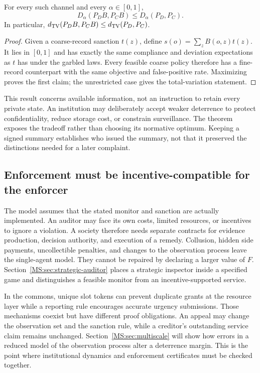 \begin{MSproposition}\label{MS:prop:enforcement-garbling}
For every such channel and every $\alpha\in[0,1]$,
\[
D_\alpha(P_D B,P_C B)\leq D_\alpha(P_D,P_C).
\]
In particular, $d_{\mathrm{TV}}(P_D B,P_C B)\leq d_{\mathrm{TV}}(P_D,P_C)$.
\end{MSproposition}
\begin{proof}
Given a coarse-record sanction $t(z)$, define $s(o)=\sum_z B(o,z)t(z)$. It lies in $[0,1]$ and has exactly the same compliance and deviation expectations as $t$ has under the garbled laws. Every feasible coarse policy therefore has a fine-record counterpart with the same objective and false-positive rate. Maximizing proves the first claim; the unrestricted case gives the total-variation statement.
\end{proof}

This result concerns available information, not an instruction to retain every private state. An institution may deliberately accept weaker deterrence to protect confidentiality, reduce storage cost, or constrain surveillance. The theorem exposes the tradeoff rather than choosing its normative optimum. Keeping a signed summary establishes who issued the summary, not that it preserved the distinctions needed for a later complaint.

\subsection{Enforcement must be incentive-compatible for the enforcer}
The model assumes that the stated monitor and sanction are actually implemented. An auditor may face its own costs, limited resources, or incentives to ignore a violation. A society therefore needs separate contracts for evidence production, decision authority, and execution of a remedy. Collusion, hidden side payments, uncollectible penalties, and changes to the observation process leave the single-agent model. They cannot be repaired by declaring a larger value of $F$. Section~\ref{MS:sec:strategic-auditor} places a strategic inspector inside a specified game and distinguishes a feasible monitor from an incentive-supported service.

In the commons, unique slot tokens can prevent duplicate grants at the resource layer while a reporting rule encourages accurate urgency submissions. Those mechanisms coexist but have different proof obligations. An appeal may change the observation set and the sanction rule, while a creditor's outstanding service claim remains unchanged. Section~\ref{MS:sec:multiscale} will show how errors in a reduced model of the observation process alter a deterrence margin. This is the point where institutional dynamics and enforcement certificates must be checked together.


